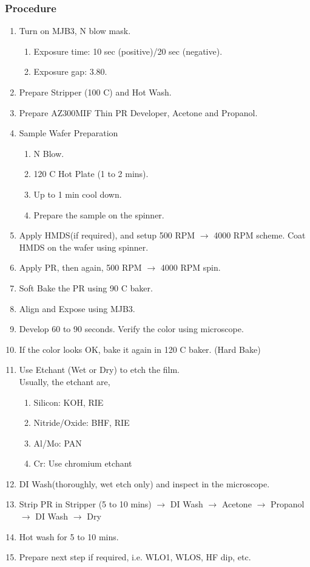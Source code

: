 \subsubsection{Procedure}
\begin{enumerate}
\item Turn on MJB3, N blow mask.
  \begin{enumerate}
  \item Exposure time: 10 sec (positive)/20 sec (negative).
  \item Exposure gap: 3.80. 
  \end{enumerate}
\item Prepare Stripper (100 C) and Hot Wash.
\item Prepare AZ300MIF Thin PR Developer, Acetone and Propanol.
\item Sample Wafer Preparation
  \begin{enumerate}
  \item N Blow.
  \item 120 C Hot Plate (1 to 2 mins).
  \item Up to 1 min cool down.
  \item Prepare the sample on the spinner.
  \end{enumerate}
\item Apply HMDS(if required), and setup 500 RPM $\rightarrow$ 4000 RPM scheme. Coat HMDS on the wafer using spinner.
\item Apply PR, then again, 500 RPM $\rightarrow$ 4000 RPM spin.
\item Soft Bake the PR using 90 C baker.
\item Align and Expose using MJB3. 
\item Develop 60 to 90 seconds. Verify the color using microscope.
\item If the color looks OK, bake it again in 120 C baker. (Hard Bake)
\item Use Etchant (Wet or Dry) to etch the film. \\
  Usually, the etchant are,
  \begin{enumerate}
  \item Silicon: KOH, RIE
  \item Nitride/Oxide: BHF, RIE
  \item Al/Mo: PAN
  \item Cr: Use chromium etchant
  \end{enumerate}
\item DI Wash(thoroughly, wet etch only) and inspect in the microscope.
\item Strip PR in Stripper (5 to 10 mins) $\rightarrow$ DI Wash %
  $\rightarrow$ Acetone $\rightarrow$ Propanol $\rightarrow$ %
  DI Wash $\rightarrow$ Dry
\item Hot wash for 5 to 10 mins.
\item Prepare next step if required, i.e. WLO1, WLOS, HF dip, etc. 
\end{enumerate}

